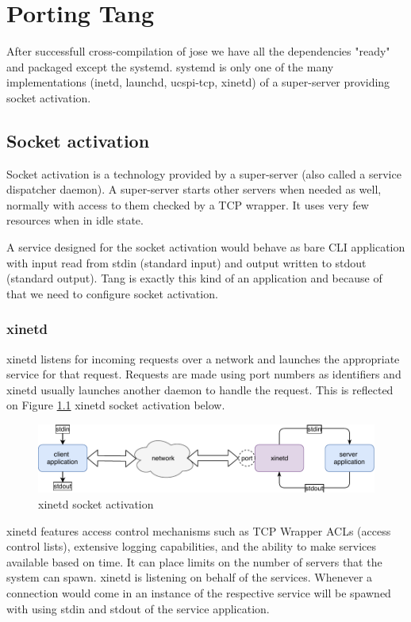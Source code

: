 \chapter{Porting Tang}\label{porting-tang}

After successfull cross-compilation of jose we have all the dependencies "ready" and packaged except the systemd.
systemd is only one of the many implementations (inetd, launchd, ucspi-tcp, xinetd) of a super-server providing socket activation.



\section{Socket activation}\label{socket_activation}

Socket activation is a technology provided by a super-server (also called a service dispatcher daemon).
A super-server starts other servers when needed as well, normally with access to them checked by a TCP wrapper.
It uses very few resources when in idle state.

A service designed for the socket activation would behave as bare CLI application with input read from stdin (standard input) and output written to stdout (standard output).
Tang is exactly this kind of an application and because of that we need to configure socket activation\cite{super_server}.



\subsection{xinetd}
xinetd listens for incoming requests over a network and launches the appropriate service for that request.
Requests are made using port numbers as identifiers and xinetd usually launches another daemon to handle the request.
This is reflected on Figure \ref{fig_xinetd} xinetd socket activation below.
\begin{figure}[h]
    \centering
    \includegraphics[scale=0.9]{figures/xinetd.pdf}
    \caption{xinetd socket activation}
    \label{fig_xinetd}
\end{figure}
xinetd features access control mechanisms such as TCP Wrapper ACLs (access control lists), extensive logging capabilities, and the ability to make services available based on time.
It can place limits on the number of servers that the system can spawn.
xinetd is listening on behalf of the services.
Whenever a connection would come in an instance of the respective service will be spawned with using stdin and stdout of the service application\cite{xinetd}.



